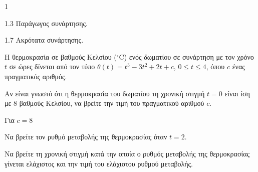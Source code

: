 \begin{ylh}{1}
    \item 1.3 Παράγωγος συνάρτησης.
    \item 1.7 Ακρότατα συνάρτησης.
\end{ylh}
Η θερμοκρασία σε βαθμούς Κελσίου ($^{\circ}$C) ενός δωματίου σε συνάρτηση με τον χρόνο $t$ σε ώρες δίνεται από τον τύπο $\theta(t) = t^3 - 3t^2 + 2t + c$, $0 \le t \le 4$, όπου $c$ ένας πραγματικός αριθμός.

\begin{alist}
\item Αν είναι γνωστό ότι η θερμοκρασία του δωματίου τη χρονική στιγμή $t=0$ είναι ίση με 8 βαθμούς Κελσίου, να βρείτε την τιμή του πραγματικού αριθμού $c$. 
\end{alist}
Για $c=8$
\begin{alist}[resume]
\setcounter{enumi}{1}
\item Να βρείτε τον ρυθμό μεταβολής της θερμοκρασίας όταν $t=2$. 
\item Να βρείτε τη χρονική στιγμή κατά την οποία ο ρυθμός μεταβολής της θερμοκρασίας γίνεται ελάχιστος και την τιμή του ελάχιστου ρυθμού μεταβολής. 
\end{alist}

